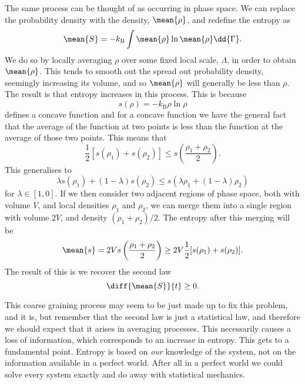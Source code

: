 \documentclass[fleqn]{NotesClass}
\newcommand*{\boltzmann}{k_{\mathrm{B}}}
\begin{document}
    The same process can be thought of as occurring in phase space.
    We can replace the probability density with the  density, \(\mean{\rho}\), and redefine the entropy as
    \begin{equation}
        \mean{S} = -\boltzmann\int \mean{\rho} \ln \mean{\rho} \dd{\Gamma}.
    \end{equation}
    We do so by locally averaging \(\rho\) over some fixed local scale, \(\Lambda\), in order to obtain \(\mean{\rho}\).
    This tends to smooth out the spread out probability density, seemingly increasing its volume, and so \(\mean{\rho}\) will generally be less than \(\rho\).
    The result is that entropy increases in this process.
    This is because
    \begin{equation}
        s(\rho) = -\boltzmann \rho\ln \rho
    \end{equation}
    defines a concave function and for a concave function we have the general fact that the average of the function at two points is less than the function at the average of those two points.
    This means that
    \begin{equation}
        \frac{1}{2}[s(\rho_1) + s(\rho_2)] \le s\left( \frac{\rho_1 + \rho_2}{2} \right).
    \end{equation}
    This generalises to
    \begin{equation}
        \lambda s(\rho_1) + (1 - \lambda)s(\rho_2) \le s(\lambda \rho_1 + (1 - \lambda)\rho_2)
    \end{equation}
    for \(\lambda \in [1, 0]\).
    If we then consider two adjacent regions of phase space, both with volume \(V\), and local densities \(\rho_1\) and \(\rho_2\), we can merge them into a single region with volume \(2V\), and density \((\rho_1 + \rho_2)/2\).
    The entropy after this merging will be
    \begin{equation}
        \mean{s} = 2Vs\left( \frac{\rho_1 + \rho_2}{2} \right) \ge 2V\frac{1}{2}[s(\rho_1) + s(\rho_2)].
    \end{equation}
    The result of this is we recover the second law
    \begin{equation}
        \diff{\mean{S}}{t} \ge 0.
    \end{equation}
    
    This coarse graining process may seem to be just made up to fix this problem, and it is, but remember that the second law is just a statistical law, and therefore we should expect that it arises in averaging processes.
    This necessarily causes a loss of information, which corresponds to an increase in entropy.
    This gets to a fundamental point.
    Entropy is based on \emph{our} knowledge of the system, not on the information available in a perfect world.
    After all in a perfect world we could solve every system exactly and do away with statistical mechanics.
    
\end{document}
